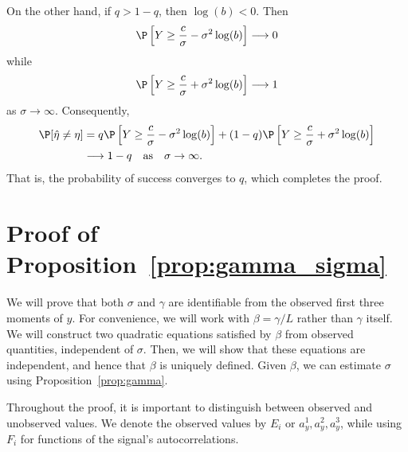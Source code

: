 \documentclass[9pt,twocolumn,twoside,lineno]{pnas-new}
\begin{document}
On the other hand, if $q > 1-q$, then $\log(b) < 0$. Then 
%
\begin{align}
%
\P\left[Y \ge \frac{c}{\sigma} - \sigma^2 \log(b) \right] \longrightarrow 0
%
\end{align}
%
while
%
\begin{align}
%
\P\left[Y \ge \frac{c}{\sigma} + \sigma^2 \log(b) \right] \longrightarrow 1
%
\end{align}
%
as $\sigma \to \infty$. Consequently,
%
\begin{align}
%
\P[\hat{\eta} \ne \eta]
&= q \P\left[Y \ge \frac{c}{\sigma} - \sigma^2 \log(b) \right]
+ (1-q) \P\left[Y \ge \frac{c}{\sigma} + \sigma^2 \log(b) \right]
\nonumber\\
& \longrightarrow 1-q  \quad \text{as} \quad  \sigma \to \infty.
%
\end{align}
%
That is, the probability of success converges to $q$, which completes the proof.

\section{Proof of Proposition~\ref{prop:gamma_sigma}} \label{sec:proof_prop_gamma_sigma}

We will prove that both $\sigma$ and $\gamma$ are identifiable from the observed first three moments of $y$. For convenience, we will work with $\beta = \gamma / L$ rather than $\gamma$ itself. We will construct two quadratic equations satisfied by $\beta$ from observed quantities, independent of $\sigma$. Then, we will show that these equations are independent, and hence that $\beta$ is uniquely defined.  Given $\beta$, we can estimate $\sigma$ using Proposition~\ref{prop:gamma}.

Throughout the proof, it is important to distinguish between observed and unobserved values. 
We denote the observed values by $E_i$ or $a_y^1,a_y^2,a_y^3$, while using $F_i$ for functions of the signal's autocorrelations. 
\end{document}
